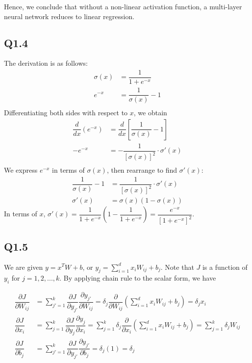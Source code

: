 \documentclass{article} %
\begin{document}
    Hence, we conclude that without a non-linear activation function, a multi-layer neural network reduces to linear regression.

    \subsection*{Q1.4}
    The derivation is as follows:
    $$\begin{aligned}
    \sigma(x)&=\dfrac{1}{1+e^{-x}}\\
    e^{-x}&=\dfrac{1}{\sigma(x)}-1\\
    \end{aligned}$$
    Differentiating both sides with respect to $x$, we obtain
    $$\begin{aligned}
    \dfrac{d}{dx}(e^{-x})&=\dfrac{d}{dx}\left[\dfrac{1}{\sigma(x)}-1\right]\\
    -e^{-x}&=-\dfrac{1}{[\sigma(x)]^2}\cdot\sigma'(x)\\
    \end{aligned}$$
    We express $e^{-x}$ in terms of $\sigma(x)$, then rearrange to find $\sigma'(x)$:
    $$\begin{aligned}
    \dfrac{1}{\sigma(x)}-1&=\dfrac{1}{[\sigma(x)]^2}\cdot\sigma'(x)\\
    \sigma'(x)&=\sigma(x)(1-\sigma(x))
    \end{aligned}$$
    In terms of $x$, $\sigma'(x)=\dfrac{1}{1+e^{-x}}\left(1-\dfrac{1}{1+e^{-x}}\right)=\dfrac{e^{-x}}{[1+e^{-x}]^2}$.

    \subsection*{Q1.5}

    We are given $y=x^{T}W+b$, or $y_{j}=\sum_{i = 1}^{d} x_{i} W_{i j} + b_{j}$. Note that $J$ is a function of $y_i$ for $j=1,2,...,k$. By applying chain rule to the scalar form, we have

    $$
    \begin{aligned}
    \dfrac{\partial J}{\partial W_{i j}}&=\sum_{j ' = 1}^{k} \dfrac{\partial J}{\partial y_{j '}} \dfrac{\partial y_{j '}}{\partial W_{i j}}=\delta_{j}\dfrac{\partial}{\partial W_{i j}}\left(\sum_{i = 1}^{d} x_{i} W_{i j} + b_{j}\right)=\delta_{j}x_{i} \\
    \dfrac{\partial J}{\partial x_{i}}&=\sum_{j = 1}^{k} \dfrac{\partial J}{\partial y_{j}} \dfrac{\partial y_{j}}{\partial x_{i}}=\sum_{j = 1}^{k} \delta_{j} \dfrac{\partial}{\partial x_{i}} \left(\sum_{i = 1}^{d} x_{i} W_{i j} + b_{j}\right)=\sum_{j = 1}^{k} \delta_{j} W_{i j}\\
    \dfrac{\partial J}{\partial b_{j}}&=\sum_{j ' = 1}^{k} \dfrac{\partial J}{\partial y_{j '}} \dfrac{\partial y_{j '}}{\partial b_{j}}=\delta_{j}\left(1\right)=\delta_{j}
    \end{aligned}
    $$
\end{document}
